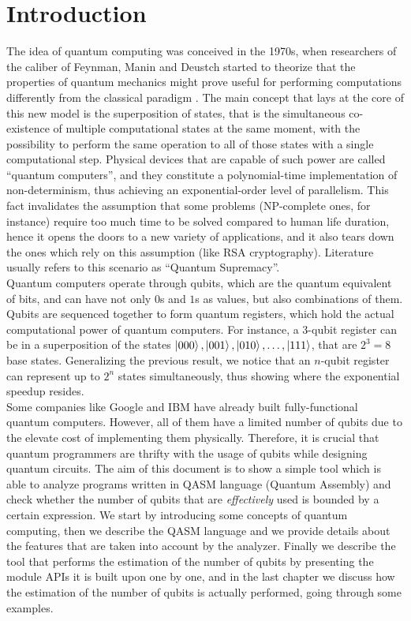 \documentclass[12pt,a4paper]{report}
\theoremstyle{definition}
\theoremstyle{definition}
\theoremstyle{definition}
\begin{document}
\chapter{Introduction}
The idea of quantum computing was conceived in the 1970s, when researchers of the caliber of Feynman, Manin and Deustch started to theorize that the properties of quantum mechanics might prove useful for performing computations differently from the classical paradigm \cite{zuw}. The main concept that lays at the core of this new model is the superposition of states, that is the simultaneous co-existence of multiple computational states at the same moment, with the possibility to perform the same operation to all of those states with a single computational step. Physical devices that are capable of such power are called ``quantum computers'', and they constitute a polynomial-time implementation of non-determinism, thus achieving an exponential-order level of parallelism. This fact invalidates the assumption that some problems (NP-complete ones, for instance) require too much time to be solved compared to human life duration, hence it opens the doors to a new variety of applications, and it also tears down the ones which rely on this assumption (like RSA cryptography). Literature usually refers to this scenario as ``Quantum Supremacy''.\\
Quantum computers operate through qubits, which are the quantum equivalent of bits, and can have not only $0$s and $1$s as values, but also combinations of them. Qubits are sequenced together to form quantum registers, which hold the actual computational power of quantum computers. For instance, a 3-qubit register can be in a superposition of the states $\ket{000}, \ket{001}, \ket{010}, \ldots, \ket{111}$, that are $2^3=8$ base states. Generalizing the previous result, we notice that an $n$-qubit register can represent up to $2^n$ states simultaneously, thus showing where the exponential speedup resides.\\
Some companies like Google and IBM have already built fully-functional quantum computers. However, all of them have a limited number of qubits due to the elevate cost of implementing them physically. Therefore, it is crucial that quantum programmers are thrifty with the usage of qubits while designing quantum circuits. The aim of this document is to show a simple tool which is able to analyze programs written in QASM language (Quantum Assembly) and check whether the number of qubits that are \textit{effectively} used is bounded by a certain expression.
We start by introducing some concepts of quantum computing, then we describe the QASM language and we provide details about the features that are taken into account by the analyzer. Finally we describe the tool that performs the estimation of the number of qubits by presenting the module APIs it is built upon one by one, and in the last chapter we discuss how the estimation of the number of qubits is actually performed, going through some examples.\\
\end{document}
